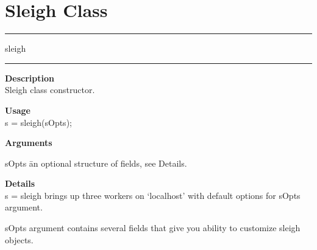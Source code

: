 \section {Sleigh Class}
\rule[0.06in]{6in}{0.01in}
\newline
sleigh
\newline
\rule{6in}{0.01in}

\begin{list}{}{}
	\item {\bf Description}\\
	  Sleigh class constructor.  
	\item {\bf Usage}\\
	  s = sleigh(sOpts);
	\item {\bf Arguments}
		\begin{tabbing}
		sOpts \hspace{2.0cm} \= an optional structure of fields, see Details.\\
		\end{tabbing}
	\item {\bf Details}\\
     s = sleigh brings up three workers on `localhost' with default options for sOpts argument.
     
     sOpts argument contains several fields that give you ability to customize sleigh objects. 
     

\end{list}
